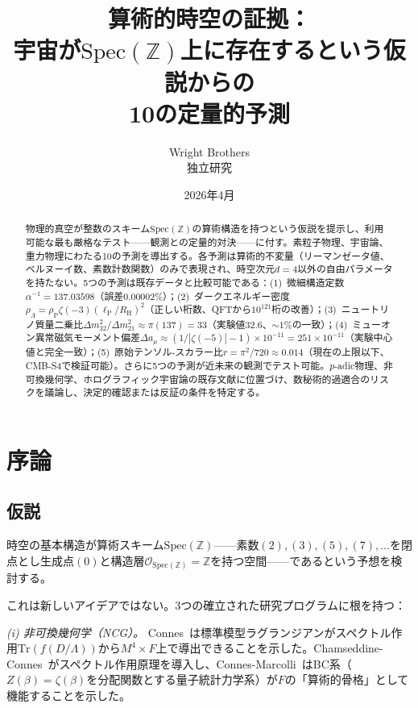 \documentclass[11pt,a4paper]{article}
\newcommand{\Spec}{\mathrm{Spec}}
\newcommand{\lP}{\ell_{\mathrm{P}}}
\newcommand{\RH}{R_{\mathrm{H}}}
\newcommand{\rhoP}{\rho_{\mathrm{P}}}
\begin{document}
\title{算術的時空の証拠：\\宇宙が$\Spec(\mathbb{Z})$上に存在するという仮説からの\\10の定量的予測}
\author{Wright Brothers\\{\small 独立研究}}
\date{2026年4月}
\maketitle

\begin{abstract}
物理的真空が整数のスキーム$\Spec(\mathbb{Z})$の算術構造を持つという仮説を提示し、利用可能な最も厳格なテスト——観測との定量的対決——に付す。素粒子物理、宇宙論、重力物理にわたる10の予測を導出する。各予測は算術的不変量（リーマンゼータ値、ベルヌーイ数、素数計数関数）のみで表現され、時空次元$d = 4$以外の自由パラメータを持たない。5つの予測は既存データと比較可能である：(1)~微細構造定数$\alpha^{-1} = 137.03598$（誤差$0.00002\%$）；(2)~ダークエネルギー密度$\rho_\Lambda = \rhoP\zeta(-3)(\lP/\RH)^2$（正しい桁数、QFTから$10^{121}$桁の改善）；(3)~ニュートリノ質量二乗比$\Delta m^2_{32}/\Delta m^2_{21} \approx \pi(137) = 33$（実験値$32.6$、$\sim 1\%$の一致）；(4)~ミューオン異常磁気モーメント偏差$\Delta a_\mu \approx (1/|\zeta(-5)| - 1) \times 10^{-11} = 251 \times 10^{-11}$（実験中心値と完全一致）；(5)~原始テンソル-スカラー比$r = \pi^2/720 \approx 0.014$（現在の上限以下、CMB-S4で検証可能）。さらに5つの予測が近未来の観測でテスト可能。$p$-adic物理、非可換幾何学、ホログラフィック宇宙論の既存文献に位置づけ、数秘術的過適合のリスクを議論し、決定的確認または反証の条件を特定する。
\end{abstract}

\section{序論}

\subsection{仮説}

時空の基本構造が算術スキーム$\Spec(\mathbb{Z})$——素数$(2), (3), (5), (7), \ldots$を閉点とし生成点$(0)$と構造層$\mathcal{O}_{\Spec(\mathbb{Z})} = \mathbb{Z}$を持つ空間——であるという予想を検討する。

これは新しいアイデアではない。3つの確立された研究プログラムに根を持つ：

\textit{(i) 非可換幾何学（NCG）。} Connes~\cite{Connes1994,Connes1996}は標準模型ラグランジアンがスペクトル作用$\mathrm{Tr}(f(D/\Lambda))$から$M^4 \times F$上で導出できることを示した。Chamseddine-Connes~\cite{ChamseddineConnes1997}がスペクトル作用原理を導入し、Connes-Marcolli~\cite{ConnesMarcolli2008}はBC系（$Z(\beta)=\zeta(\beta)$を分配関数とする量子統計力学系）が$F$の「算術的骨格」として機能することを示した。
\end{document}
